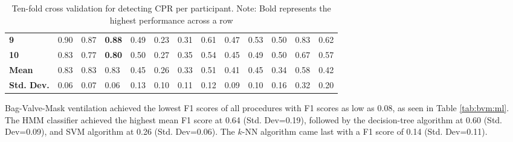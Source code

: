 \begin{table}[h]
\begin{tabular}{lllllllllllll}
		\textbf{9}   & 0.90 & 0.87 & \textbf{0.88} & 0.49 & 0.23 & 0.31 & 0.61 & 0.47 & 0.53 & 0.50 & 0.83 & 0.62 \\
		\textbf{10} & 0.83 & 0.77 & \textbf{0.80} & 0.50 & 0.27 & 0.35 & 0.54 & 0.45 & 0.49 & 0.50 & 0.67 & 0.57 \\
		\hline
		\textbf{Mean} & 0.83 & 0.83 & 0.83 & 0.45 & 0.26 & 0.33 & 0.51 & 0.41 & 0.45 & 0.34 & 0.58 & 0.42 \\
		\textbf{Std. Dev.} & 0.06 & 0.07 & 0.06 & 0.13 & 0.10 & 0.11 & 0.12 & 0.09 & 0.10 & 0.16 & 0.32 & 0.20
	\end{tabular}
	\caption{Ten-fold cross validation for detecting CPR per participant. Note: Bold represents the highest performance across a row}
	\label{tab:cpr:ml}
\end{table}

\par Bag-Valve-Mask ventilation achieved the lowest F1 scores of all procedures with F1 scores as low as 0.08, as seen in Table \ref{tab:bvm:ml}. The HMM classifier achieved the highest mean F1 score at 0.64 (Std. Dev=0.19), followed by the decision-tree algorithm at 0.60 (Std. Dev=0.09), and SVM algorithm at 0.26 (Std. Dev=0.06). The $k$-NN algorithm came last with a F1 score of 0.14 (Std. Dev=0.11).

